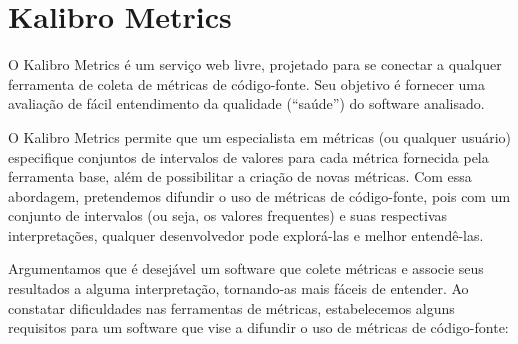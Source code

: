 \section{Kalibro Metrics}
\label{sec:kalibro}

O Kalibro Metrics é um serviço web livre, projetado para se conectar a qualquer
ferramenta de coleta de métricas de código-fonte. Seu objetivo é
fornecer uma avaliação de fácil entendimento da qualidade (``saúde'') do
software analisado.
%

O Kalibro Metrics permite que um especialista em métricas (ou qualquer usuário)
especifique conjuntos de intervalos de valores para cada métrica fornecida pela
ferramenta base, além de possibilitar a criação de novas métricas.
%
Com essa abordagem, pretendemos difundir o uso de métricas de código-fonte, pois
com um conjunto de intervalos (ou seja, os valores frequentes) e suas
respectivas interpretações, qualquer desenvolvedor pode explorá-las e melhor
entendê-las.

Argumentamos que é desejável um software que colete métricas e associe seus
resultados a alguma interpretação, tornando-as mais fáceis de entender.
%
Ao constatar dificuldades nas ferramentas de métricas, estabelecemos
alguns requisitos para um software que vise a difundir o uso de métricas
de código-fonte:


